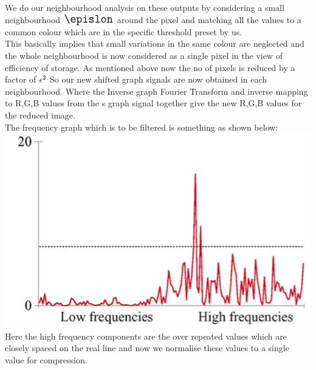 \documentclass[12pt,onecolumn]{article}
\begin{document}
We do our neighbourhood analysis on these outputs by considering a small neighbourhood ${\Large \epislon }$ around the pixel and matching all the values to a common colour which are in the specific threshold preset by us.\\

This basically implies that small variations in the same colour are neglected and the whole neighbourhood is now considered as a single pixel in the view of efficiency of storage. As mentioned above now the no of pixels is reduced by a factor of ${\large \epsilon^{2}
}$ So our new shifted graph signals are now obtained in each neighbourhood. Where the Inverse graph Fourier Transform and inverse mapping to R,G,B values from the {\Large{s}} graph signal together give the new R,G,B values for the reduced image. \\
\newline
The frequency graph which is to be filtered is something as shown below: \\
\newline
\includegraphics{images/FREQUENCY.png}  \\
\newline
Here the high frequency components are the over repeated values which are closely spaced on the real line and now we normalise these values to a single value for compression.
\end{document}
